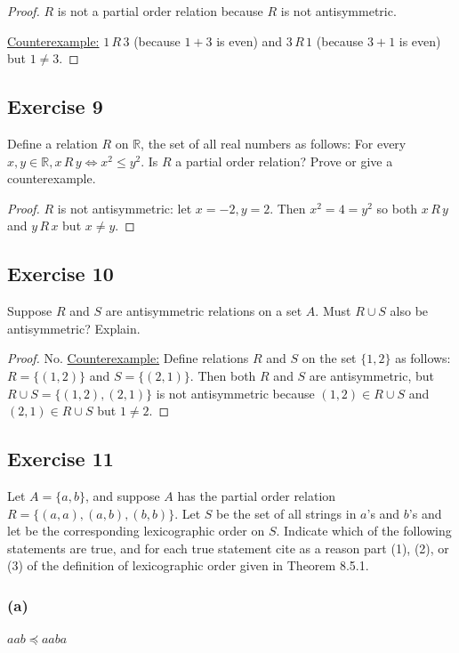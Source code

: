 \documentclass[14pt]{extarticle}
\newcommand{\R}{\mathbb{R}}
\begin{document}
\begin{proof}
        $R$ is not a partial order relation because $R$ is not antisymmetric.

        \underline{Counterexample:} \(1 \,R\, 3\) (because \(1 + 3\) is even) and \(3 \,R\, 1\) (because \(3 + 1\) is even)
        but \(1 \neq 3\).
\end{proof}

\subsection{Exercise 9}
Define a relation $R$ on $\R$, the set of all real numbers as follows: For every \(x,y\in\R,x\,R\,y\iff x^2\leq y^2\).
Is $R$ a partial order relation? Prove or give a counterexample.

\begin{proof}
        $R$ is not antisymmetric: let \(x = -2, y = 2\). Then \(x^2 = 4 = y^2\) so both \(x \,R\, y\) and \(y \,R\, x\) but
        \(x \neq y\).
\end{proof}

\subsection{Exercise 10}
Suppose $R$ and $S$ are antisymmetric relations on a set $A$. Must \(R \cup S\) also be antisymmetric? Explain.

\begin{proof}
        No. \underline{Counterexample:} Define relations $R$ and $S$ on the set \(\{1, 2\}\) as follows: \(R = \{(1, 2)\}\)
        and \(S = \{(2, 1)\}\). Then both $R$ and $S$ are antisymmetric, but \(R \cup S = \{(1, 2), (2, 1)\}\) is not antisymmetric because \((1, 2) \in R \cup S\) and \((2, 1)
        \in R \cup S\) but \(1 \neq 2\).
\end{proof}

\subsection{Exercise 11}
Let \(A = \{a, b\}\), and suppose \(A\) has the partial order relation \(R = \{(a, a),(a, b), (b, b)\}\).
Let \(S\) be the set of all strings in \(a\)’s and \(b\)’s and let be the corresponding lexicographic order on \(S\).
Indicate which of the following statements are true, and for each true statement cite as a reason part (1), (2), or
(3) of the definition of lexicographic order given in Theorem 8.5.1.

\subsubsection{(a)}
\(aab \preceq aaba\)
\end{document}

